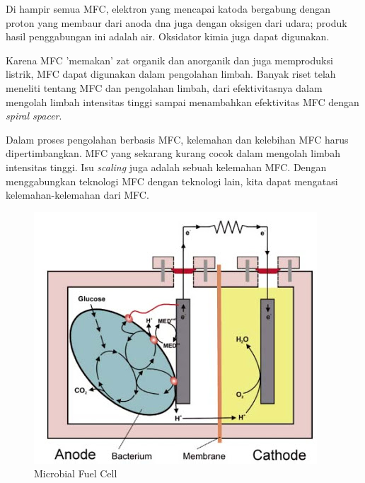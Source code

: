 \documentclass[10pt,a4paper,hidelinks]{article}
\begin{document}
Di hampir semua MFC, elektron yang mencapai katoda bergabung dengan proton yang membaur dari anoda dna juga dengan oksigen dari udara; produk hasil penggabungan ini adalah air. Oksidator kimia juga dapat digunakan.


Karena MFC 'memakan' zat organik dan anorganik dan juga memproduksi listrik, MFC dapat digunakan dalam pengolahan limbah. Banyak riset telah meneliti tentang MFC dan pengolahan limbah, dari efektivitasnya dalam mengolah limbah intensitas tinggi sampai menambahkan efektivitas MFC dengan \textit{spiral spacer}.


Dalam proses pengolahan berbasis MFC, kelemahan dan kelebihan MFC  harus dipertimbangkan. MFC yang sekarang kurang cocok dalam mengolah limbah intensitas tinggi. Isu \textit{scaling} juga adalah sebuah kelemahan MFC. Dengan menggabungkan teknologi MFC dengan teknologi lain, kita dapat mengatasi kelemahan-kelemahan dari MFC.
	\begin{figure}[!ht]
	\centering
		\includegraphics[scale=0.75]{gfx/mfc}
		\caption{Microbial Fuel Cell}
	\end{figure}
\end{document}
